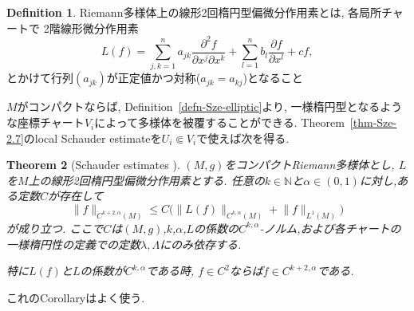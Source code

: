 \documentclass[dvipdfmx,a4paper,11pt]{article} %
\newtheorem{thm}{Theorem}[section]
\theoremstyle{definition}
\newtheorem{defn}[thm]{Definition}
\theoremstyle{remark}
\numberwithin{equation}{section}
\newcommand{\N}{\mathbb{N}}
\begin{document}
\begin{defn}
Riemann多様体上の線形2回楕円型偏微分作用素とは, 各局所チャートで
2階線形微分作用素
\[
L(f)=\sum_{j,k=1}^n a_{jk}\frac{\partial^2 f}{\partial x^j\partial x^k}
+\sum_{l=1}^n b_l\frac{\partial f}{\partial x^l}+cf,
\]
とかけて行列$(a_{jk})$が正定値かつ対称($a_{jk}=a_{kj}$)となること
\end{defn}
$M$がコンパクトならば, Definition~\ref{defn-Sze-elliptic}より, 一様楕円型となるような座標チャート$V_i$によって多様体を被覆することができる. 
Theorem~\ref{thm-Sze-2.7}のlocal Schauder estimateを$U_i \Subset V_i$で使えば次を得る. 
\begin{thm}
[Schauder estimates {\cite[Theorem 2.9]{Sze14}}]
\label{thm-Schauder}
$(M,g)$をコンパクトRiemann多様体とし, $L$を$M$上の線形2回楕円型偏微分作用素とする.
任意の$k \in \N$と$\alpha\in(0,1)$に対し,ある定数$C$が存在して
\[
\lVert f\rVert_{C^{k+2,\alpha}(M)}\leq C\bigl(\lVert L(f)\rVert_{C^{k,\alpha}(M)}+\lVert f\rVert_{L^1(M)}\bigr)
\]
が成り立つ.
ここで$C$は$(M,g)$,$k$,$\alpha$,$L$の係数の$C^{k,\alpha}$-ノルム,および各チャートの一様楕円性の定義での定数$\lambda,\Lambda$にのみ依存する.

特に$L(f)$と$L$の係数が$C^{k,\alpha}$である時, $f\in C^2$ならば$f\in C^{k+2,\alpha}$である. 
\end{thm}
これのCorollaryはよく使う. 
\end{document}
